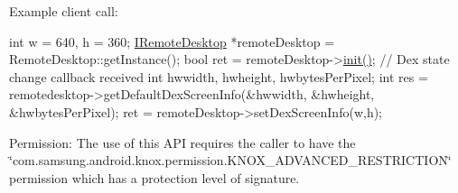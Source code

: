 \-Example client call\-:


\begin{DoxyPre}
  int w = 640, h = 360;
  \hyperlink{classknoxremotedesktop_1_1IRemoteDesktop}{IRemoteDesktop} *remoteDesktop = RemoteDesktop::getInstance();
  bool ret = remoteDesktop->\hyperlink{classknoxremotedesktop_1_1IRemoteDesktop_a7bed40d98c61713a69cf1dad8b37beae}{init()};
  // Dex state change callback received
  int hwwidth, hwheight, hwbytesPerPixel;	
  int res = remotedesktop->getDefaultDexScreenInfo(&hwwidth, &hwheight, &hwbytesPerPixel);
  ret = remoteDesktop->setDexScreenInfo(w,h);
 \end{DoxyPre}


\begin{DoxyParagraph}{\-Permission\-: }
\-The use of this \-A\-P\-I requires the caller to have the \char`\"{}com.\-samsung.\-android.\-knox.\-permission.\-K\-N\-O\-X\-\_\-\-A\-D\-V\-A\-N\-C\-E\-D\-\_\-\-R\-E\-S\-T\-R\-I\-C\-T\-I\-O\-N\char`\"{} permission which has a protection level of signature.
\end{DoxyParagraph}

